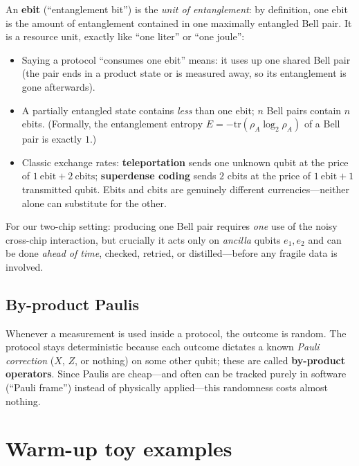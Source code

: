 \documentclass[11pt]{article}
\begin{document}
An \textbf{ebit} (``entanglement bit'') is the \emph{unit of entanglement}:
by definition, one ebit is the amount of entanglement contained in one
maximally entangled Bell pair. It is a resource unit, exactly like
``one liter'' or ``one joule'':

\begin{itemize}[leftmargin=2em]
  \item Saying a protocol ``consumes one ebit'' means: it uses up one shared
        Bell pair (the pair ends in a product state or is measured away, so
        its entanglement is gone afterwards).
  \item A partially entangled state contains \emph{less} than one ebit; $n$
        Bell pairs contain $n$ ebits. (Formally, the entanglement entropy
        $E = -\mathrm{tr}(\rho_A \log_2 \rho_A)$ of a Bell pair is exactly
        $1$.)
  \item Classic exchange rates:
        \textbf{teleportation} sends one unknown qubit at the price of
        $1\ \text{ebit} + 2\ \text{cbits}$;
        \textbf{superdense coding} sends $2$ cbits at the price of
        $1\ \text{ebit} + 1$ transmitted qubit. Ebits and cbits are genuinely
        different currencies---neither alone can substitute for the other.
\end{itemize}

For our two-chip setting: producing one Bell pair requires \emph{one} use of
the noisy cross-chip interaction, but crucially it acts only on \emph{ancilla}
qubits $e_1, e_2$ and can be done \emph{ahead of time}, checked, retried, or
distilled---before any fragile data is involved.

\subsection{By-product Paulis}

Whenever a measurement is used inside a protocol, the outcome is random. The
protocol stays deterministic because each outcome dictates a known
\emph{Pauli correction} ($X$, $Z$, or nothing) on some other qubit; these are
called \textbf{by-product operators}. Since Paulis are cheap---and often can
be tracked purely in software (``Pauli frame'') instead of physically
applied---this randomness costs almost nothing.

\section{Warm-up toy examples}
\end{document}
